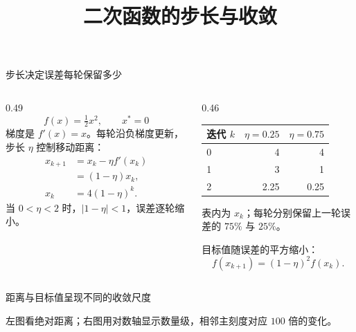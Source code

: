 \documentclass[aspectratio=169,10pt]{beamer}
\title{二次函数的步长与收敛}
\begin{document}
\begin{frame}[c,label=recurrence]{步长决定误差每轮保留多少}
\begin{columns}[T,onlytextwidth]
\begin{column}{0.49\textwidth}
\[
 f(x)=\tfrac12 x^2,\qquad x^*=0
\]
梯度是 $f'(x)=x$。每轮沿负梯度更新，步长 $\eta$ 控制移动距离：
\begin{align*}
 x_{k+1}&=x_k-\eta f'(x_k)\\
        &=(1-\eta)x_k,\\
 x_k&=4(1-\eta)^k.
\end{align*}
当 $0<\eta<2$ 时，$|1-\eta|<1$，误差逐轮缩小。
\end{column}
\begin{column}{0.46\textwidth}
\medskip

\renewcommand{\arraystretch}{1.25}
\begin{tabular}{@{}lrr@{}}
\toprule
迭代 $k$ & $\eta=0.25$ & $\eta=0.75$\\
\midrule
0 & 4 & 4\\
1 & 3 & 1\\
2 & 2.25 & 0.25\\
\bottomrule
\end{tabular}
\medskip

表内为 $x_k$；每轮分别保留上一轮误差的 $75\%$ 与 $25\%$。
\medskip

目标值随误差的平方缩小：
\[
 f(x_{k+1})=(1-\eta)^2 f(x_k).
\]
\end{column}
\end{columns}
\end{frame}

\begin{frame}[c,label=curves]{距离与目标值呈现不同的收敛尺度}
\centering

\par\vspace{1mm}
\raggedright
{}
\par\medskip
\BodyFont
左图看绝对距离；右图用对数轴显示数量级，相邻主刻度对应 $100$ 倍的变化。
\end{frame}
\end{document}
